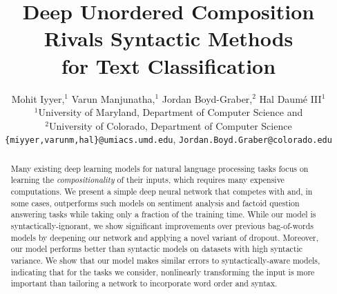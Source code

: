 \documentclass[11pt,letterpaper]{article}
\title{Deep Unordered Composition Rivals Syntactic Methods \\for Text Classification}
\author{
	Mohit Iyyer,$^{1}$ Varun Manjunatha,$^{1}$ Jordan Boyd-Graber,$^{2}$ Hal Daumé III$^{1}$\\
	$^1$University of Maryland, Department of Computer Science and \abr{umiacs}\\
        $^2$University of Colorado, Department of Computer Science \\
  	{\tt \{miyyer,varunm,hal\}@umiacs.umd.edu}, {\tt Jordan.Boyd.Graber@colorado.edu} \\
}
\begin{document}
\maketitle
\begin{abstract}
  Many existing deep learning models for natural language processing
  tasks focus on learning the \emph{compositionality} of their inputs,
  which requires many expensive computations. We present a simple deep
  neural network that competes with and, in some cases, outperforms
  such models on sentiment analysis and factoid question answering
  tasks while taking only a fraction of the training time. While our
  model is syntactically-ignorant, we show significant improvements
  over previous bag-of-words models by deepening our network and
  applying a novel variant of dropout. Moreover, our model performs
  better than syntactic models on datasets with high syntactic
  variance. We show that our model makes similar errors to
  syntactically-aware models, indicating that for the tasks we
  consider, nonlinearly transforming the input is more important than
  tailoring a network to incorporate word order and syntax.


\end{abstract}










\clearpage


\footnotesize

\end{document}
